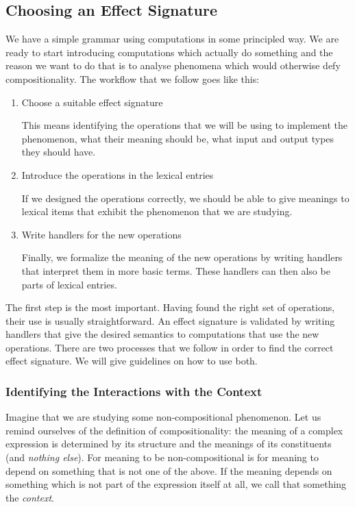 \subsection{Choosing an Effect Signature}
\label{ssec:choosing-effect-signature}

We have a simple grammar using computations in some principled way. We are
ready to start introducing computations which actually do something and the
reason we want to do that is to analyse phenomena which would otherwise
defy compositionality. The workflow that we follow goes like this:

\begin{enumerate}
\item Choose a suitable effect signature

  This means identifying the operations that we will be using to implement
  the phenomenon, what their meaning should be, what input and output types
  they should have.
  
\item Introduce the operations in the lexical entries
  
  If we designed the operations correctly, we should be able to give
  meanings to lexical items that exhibit the phenomenon that we are
  studying.
  
\item Write handlers for the new operations
  
  Finally, we formalize the meaning of the new operations by writing
  handlers that interpret them in more basic terms. These handlers can then
  also be parts of lexical entries.
\end{enumerate}

The first step is the most important. Having found the right set of
operations, their use is usually straightforward. An effect signature is
validated by writing handlers that give the desired semantics to
computations that use the new operations. There are two processes that we
follow in order to find the correct effect signature. We will give
guidelines on how to use both.


\subsubsection{Identifying the Interactions with the Context}

Imagine that we are studying some non-compositional phenomenon. Let us
remind ourselves of the definition of compositionality: the meaning of a
complex expression is determined by its structure and the meanings of its
constituents~\cite{sep-compositionality} (and \emph{nothing else}). For
meaning to be non-compositional is for meaning to depend on something that
is not one of the above. If the meaning depends on something which is not
part of the expression itself at all, we call that something the
\emph{context}.

